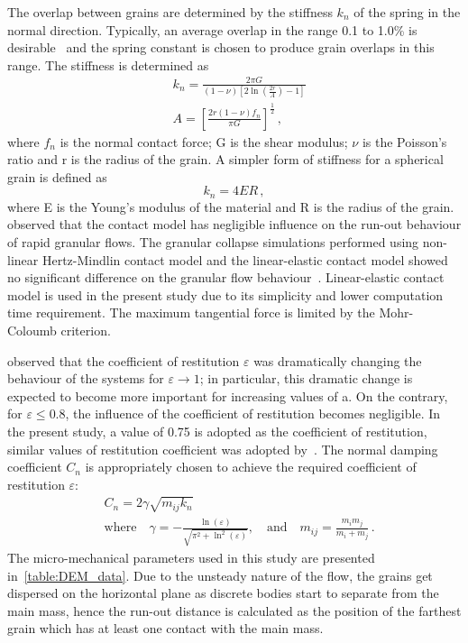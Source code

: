 The overlap between grains are determined by the stiffness 
$\textit{k}_{\textit{n}}$ of the spring in the normal direction. Typically, 
an average overlap in the range 0.1 to 1.0\% is desirable~\cite{Zenit2005} and 
the spring constant is chosen to produce grain overlaps in this range. The 
stiffness is determined as
\begin{align}
& \textit{k}_{\textit{n}}=\frac{2 \pi G}{(1-\nu)[2\ln(\frac{2r}{A})-1]} \\ 
& A = [\frac{2r(1-\nu)f_{n}}{\pi G}]^{\frac{1	}{2}}\,,
\end{align}
where $f_{n}$ is the normal contact force; G is the shear modulus; $\nu$ is the 
Poisson's ratio and r is the radius of the grain. A simpler form of stiffness 
for a spherical grain is defined as
\begin{equation}
\textit{k}_{\textit{n}}=4ER\,,
\end{equation}
where E is the Young's modulus of the material and R is the radius of the 
grain.~\citet{Cambou2009} observed that the contact model has negligible 
influence on the run-out behaviour of rapid granular flows. The granular 
collapse simulations performed using non-linear Hertz-Mindlin contact model and 
the linear-elastic contact model showed no significant difference on the 
granular flow behaviour~\citet{Utili2014}. Linear-elastic contact model is used 
in the present study due to its simplicity and lower computation time 
requirement. The maximum tangential force is limited by the Mohr-Coloumb 
criterion. 


\citet{Staron2007a} observed that the coefficient of restitution $\varepsilon$ 
was dramatically changing the behaviour of the systems for 
$\varepsilon\longrightarrow 1$; in particular, this dramatic change is expected 
to become more important for increasing values of a. On the contrary, for 
$\varepsilon \le 0.8$, the influence of the coefficient of restitution becomes 
negligible. In the present study, a value of 0.75 is adopted as the coefficient 
of restitution, similar values of restitution coefficient was adopted 
by~\citet{Zenit2005,Girolami}. The normal damping coefficient 
$C_{\textit{n}}$ 
is appropriately chosen to achieve the required coefficient of restitution 
$\varepsilon$:
\begin{align}
& C_{\textit{n}}=2\gamma \sqrt{m_{\textit{ij}}k_{\textit{n}}} \\ 
& \mbox{where} \quad \gamma = -\frac{\ln(\varepsilon)}{\sqrt{\pi^{2}+\ln^2 
(\varepsilon)}},\quad \mbox{and} \quad 
\textit{m}_{\textit{ij}}=\frac{\textit{m}_{\textit{i}}\textit{m}_{\textit{j}}}{\textit{m}_{\textit{i}}
 + \textit{m}_{\textit{j}}} \,.
\end{align}
%
The micro-mechanical parameters used in this study are presented 
in~\cref{table:DEM_data}. Due to the unsteady nature of the flow, the 
grains get dispersed on the horizontal plane as discrete bodies start to 
separate from the main mass, hence the run-out distance is calculated as the 
position of the farthest grain which has at least one contact with the main 
mass.

